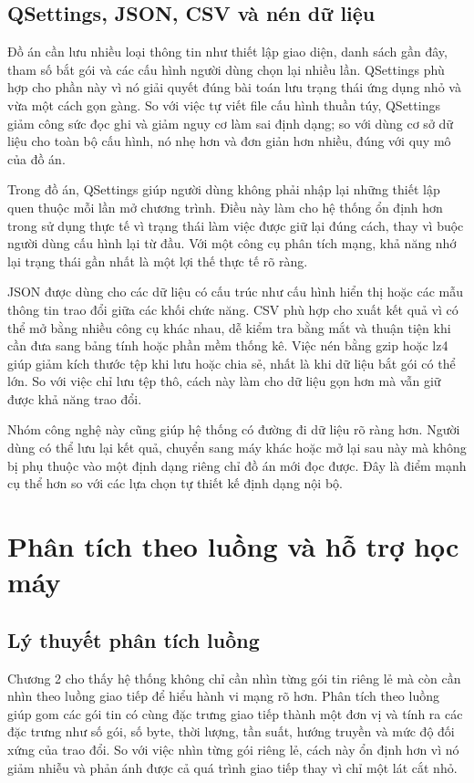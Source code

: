 \documentclass[../DoAn.tex]{subfiles}
\begin{document}
\subsection{QSettings, JSON, CSV và nén dữ liệu}
Đồ án cần lưu nhiều loại thông tin như thiết lập giao diện, danh sách gần đây, tham số bắt gói và các cấu hình người dùng chọn lại nhiều lần. QSettings phù hợp cho phần này vì nó giải quyết đúng bài toán lưu trạng thái ứng dụng nhỏ và vừa một cách gọn gàng. So với việc tự viết file cấu hình thuần túy, QSettings giảm công sức đọc ghi và giảm nguy cơ làm sai định dạng; so với dùng cơ sở dữ liệu cho toàn bộ cấu hình, nó nhẹ hơn và đơn giản hơn nhiều, đúng với quy mô của đồ án.

Trong đồ án, QSettings giúp người dùng không phải nhập lại những thiết lập quen thuộc mỗi lần mở chương trình. Điều này làm cho hệ thống ổn định hơn trong sử dụng thực tế vì trạng thái làm việc được giữ lại đúng cách, thay vì buộc người dùng cấu hình lại từ đầu. Với một công cụ phân tích mạng, khả năng nhớ lại trạng thái gần nhất là một lợi thế thực tế rõ ràng.

JSON được dùng cho các dữ liệu có cấu trúc như cấu hình hiển thị hoặc các mẫu thông tin trao đổi giữa các khối chức năng. CSV phù hợp cho xuất kết quả vì có thể mở bằng nhiều công cụ khác nhau, dễ kiểm tra bằng mắt và thuận tiện khi cần đưa sang bảng tính hoặc phần mềm thống kê. Việc nén bằng gzip hoặc lz4 giúp giảm kích thước tệp khi lưu hoặc chia sẻ, nhất là khi dữ liệu bắt gói có thể lớn. So với việc chỉ lưu tệp thô, cách này làm cho dữ liệu gọn hơn mà vẫn giữ được khả năng trao đổi.

Nhóm công nghệ này cũng giúp hệ thống có đường đi dữ liệu rõ ràng hơn. Người dùng có thể lưu lại kết quả, chuyển sang máy khác hoặc mở lại sau này mà không bị phụ thuộc vào một định dạng riêng chỉ đồ án mới đọc được. Đây là điểm mạnh cụ thể hơn so với các lựa chọn tự thiết kế định dạng nội bộ.

\section{Phân tích theo luồng và hỗ trợ học máy}
\subsection{Lý thuyết phân tích luồng}
Chương 2 cho thấy hệ thống không chỉ cần nhìn từng gói tin riêng lẻ mà còn cần nhìn theo luồng giao tiếp để hiểu hành vi mạng rõ hơn. Phân tích theo luồng giúp gom các gói tin có cùng đặc trưng giao tiếp thành một đơn vị và tính ra các đặc trưng như số gói, số byte, thời lượng, tần suất, hướng truyền và mức độ đối xứng của trao đổi. So với việc nhìn từng gói riêng lẻ, cách này ổn định hơn vì nó giảm nhiễu và phản ánh được cả quá trình giao tiếp thay vì chỉ một lát cắt nhỏ.
\end{document}
